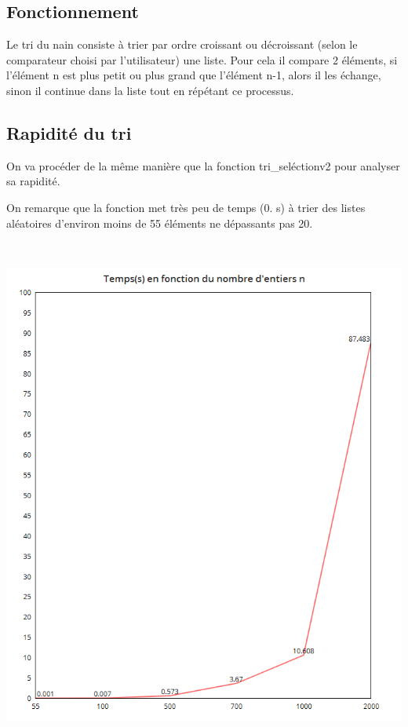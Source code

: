 \documentclass[a4paper, 12pt]{article}
\begin{document}
\subsection{Fonctionnement}

Le tri du nain consiste à trier par ordre croissant ou décroissant (selon le comparateur choisi par l'utilisateur) une liste. Pour cela il compare 2 éléments, si l'élément n est plus petit ou plus grand que l'élément n-1, alors il les échange, sinon il continue dans la liste tout en répétant ce processus.

\subsection{Rapidité du tri}

On va procéder de la même manière que la fonction tri\_seléctionv2 pour analyser sa rapidité.

On remarque que la fonction met très peu de temps (0. s) à trier des listes aléatoires d'environ moins de 55 éléments ne dépassants pas 20.

~

\begin{center}
\includegraphics[scale=0.25]{tridunainN.png}
\end{center}
~
\end{document}
